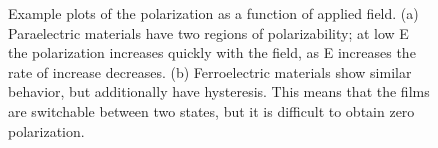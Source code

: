 \begin{figure}[tb]
   \centering
   \hspace{0.5cm}	
   \caption[Polarization vs. Applied Field Plots for FE and PE Materials]%
   		{Example plots of the polarization as a function of applied field. (a) Paraelectric materials %
		have two regions of polarizability; at low E the polarization increases quickly with the field, %
		as E increases the rate of increase decreases. (b) Ferroelectric materials show similar %
		behavior, but additionally have hysteresis. This means that the films are switchable %
		between two states, but it is difficult to obtain zero polarization.}
   \label{fig:PvElec}
\end{figure}































